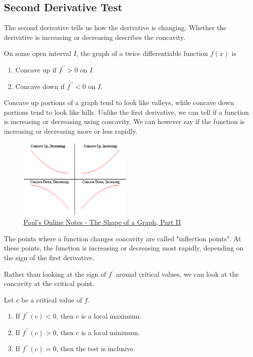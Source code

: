 \subsection{Second Derivative Test}
The second derivative tells us how the derivative is changing.
Whether the derivative is increasing or decreasing describes the concavity.
\begin{definition}
	On some open interval $I$, the graph of a twice differentiable function $f(x)$ is
	\begin{enumerate}
		\item Concave up if $f^{\prime\prime} > 0$ on $I$.
		\item Concave down if $f^{\prime\prime} < 0$ on $I$.
	\end{enumerate}
\end{definition}


Concave up portions of a graph tend to look like valleys, while concave down portions tend to look like hills.
Unlike the first derivative, we can tell if a function is increasing or decreasing using concavity.
We can however say if the function is increasing or decreasing more or less rapidly.

\begin{figure}[H]
	\label{mvt}
	\centering
	\includegraphics[width = 0.5\textwidth]{./applications_derivative/concavity.png}
	\caption{\hyperref{https://tutorial.math.lamar.edu/classes/calci/shapeofgraphptii.aspx}{}{}{Paul's Online Notes - The Shape of a Graph, Part II}}
\end{figure}


The points where a function changes concavity are called "inflection points".
At these points, the function is increasing or decreasing most rapidly, depending on the sign of the first derivative.


Rather than looking at the sign of $f^\prime$ around critical values, we can look at the concavity at the critical point.
\begin{theorem}
	Let $c$ be a critical value of $f$.
	\begin{enumerate}
		\item If $f^{\prime\prime}(c) < 0$, then $c$ is a local maximum.
		\item If $f^{\prime\prime}(c) > 0$, then $c$ is a local minimum.
		\item If $f^{\prime\prime}(c) = 0$, then the test is inclusive.
	\end{enumerate}
\end{theorem}

